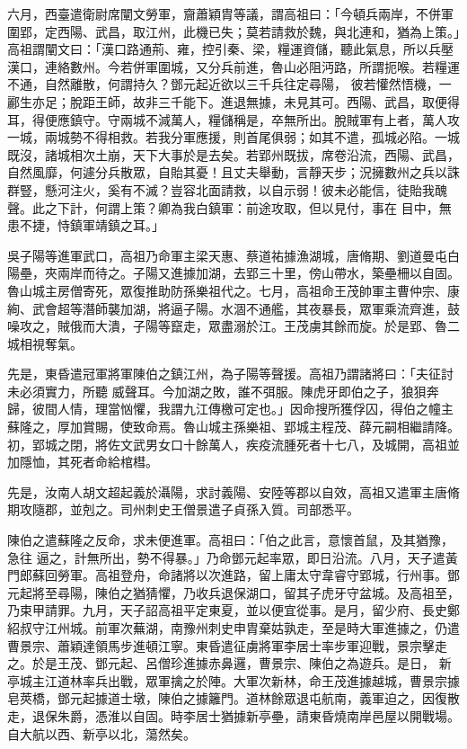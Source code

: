 \begin{pinyinscope}
 六月，西臺遣衛尉席闡文勞軍，齎蕭穎胄等議，謂高祖曰：「今頓兵兩岸，不併軍圍郢，定西陽、武昌，取江州，此機已失；莫若請救於魏，與北連和，猶為上策。」高祖謂闡文曰：「漢口路通荊、雍，控引秦、梁，糧運資儲，聽此氣息，所以兵壓漢口，連絡數州。今若併軍圍城，又分兵前進，魯山必阻沔路，所謂扼喉。若糧運不通，自然離散，何謂持久？鄧元起近欲以三千兵往定尋陽，
 彼若懽然悟機，一酈生亦足；脫距王師，故非三千能下。進退無據，未見其可。西陽、武昌，取便得耳，得便應鎮守。守兩城不減萬人，糧儲稱是，卒無所出。脫賊軍有上者，萬人攻一城，兩城勢不得相救。若我分軍應援，則首尾俱弱；如其不遣，孤城必陷。一城既沒，諸城相次土崩，天下大事於是去矣。若郢州既拔，席卷沿流，西陽、武昌，自然風靡，何遽分兵散眾，自貽其憂！且丈夫舉動，言靜天步；況擁數州之兵以誅群豎，懸河注火，奚有不滅？豈容北面請救，以自示弱！彼未必能信，徒貽我醜聲。此之下計，何謂上策？卿為我白鎮軍：前途攻取，但以見付，事在
 目中，無患不捷，恃鎮軍靖鎮之耳。」



 吳子陽等進軍武口，高祖乃命軍主梁天惠、蔡道祐據漁湖城，唐脩期、劉道曼屯白陽壘，夾兩岸而待之。子陽又進據加湖，去郢三十里，傍山帶水，築壘柵以自固。魯山城主房僧寄死，眾復推助防孫樂祖代之。七月，高祖命王茂帥軍主曹仲宗、康絢、武會超等潛師襲加湖，將逼子陽。水涸不通艦，其夜暴長，眾軍乘流齊進，鼓噪攻之，賊俄而大潰，子陽等竄走，眾盡溺於江。王茂虜其餘而旋。於是郢、魯二城相視奪氣。



 先是，東昏遣冠軍將軍陳伯之鎮江州，為子陽等聲援。高祖乃謂諸將曰：「夫征討未必須實力，所聽
 威聲耳。今加湖之敗，誰不弭服。陳虎牙即伯之子，狼狽奔歸，彼間人情，理當忷懼，我謂九江傳檄可定也。」因命搜所獲俘囚，得伯之幢主蘇隆之，厚加賞賜，使致命焉。魯山城主孫樂祖、郢城主程茂、薛元嗣相繼請降。初，郢城之閉，將佐文武男女口十餘萬人，疾疫流腫死者十七八，及城開，高祖並加隱恤，其死者命給棺槥。



 先是，汝南人胡文超起義於灄陽，求討義陽、安陸等郡以自效，高祖又遣軍主唐脩期攻隨郡，並剋之。司州刺史王僧景遣子貞孫入質。司部悉平。



 陳伯之遣蘇隆之反命，求未便進軍。高祖曰：「伯之此言，意懷首鼠，及其猶豫，急往
 逼之，計無所出，勢不得暴。」乃命鄧元起率眾，即日沿流。八月，天子遣黃門郎蘇回勞軍。高祖登舟，命諸將以次進路，留上庸太守韋睿守郢城，行州事。鄧元起將至尋陽，陳伯之猶猜懼，乃收兵退保湖口，留其子虎牙守盆城。及高祖至，乃束甲請罪。九月，天子詔高祖平定東夏，並以便宜從事。是月，留少府、長史鄭紹叔守江州城。前軍次蕪湖，南豫州刺史申胄棄姑孰走，至是時大軍進據之，仍遣曹景宗、蕭穎達領馬步進頓江寧。東昏遣征虜將軍李居士率步軍迎戰，景宗擊走之。於是王茂、鄧元起、呂僧珍進據赤鼻邏，曹景宗、陳伯之為遊兵。是日，
 新亭城主江道林率兵出戰，眾軍擒之於陣。大軍次新林，命王茂進據越城，曹景宗據皂莢橋，鄧元起據道士墩，陳伯之據籬門。道林餘眾退屯航南，義軍迫之，因復散走，退保朱爵，憑淮以自固。時李居士猶據新亭壘，請東昏燒南岸邑屋以開戰場。自大航以西、新亭以北，蕩然矣。




\end{pinyinscope}
